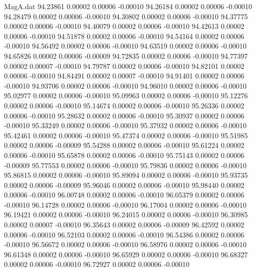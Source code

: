 \begin{filecontents}{MagA.dat}
  94.23861    0.00002    0.00006   -0.00010
  94.26184    0.00002    0.00006   -0.00010
  94.28479    0.00002    0.00006   -0.00010
  94.30802    0.00002    0.00006   -0.00010
  94.37775    0.00002    0.00006   -0.00010
  94.40079    0.00002    0.00006   -0.00010
  94.42613    0.00002    0.00006   -0.00010
  94.51878    0.00002    0.00006   -0.00010
  94.54164    0.00002    0.00006   -0.00010
  94.56492    0.00002    0.00006   -0.00010
  94.63519    0.00002    0.00006   -0.00010
  94.65826    0.00002    0.00006   -0.00009
  94.72835    0.00002    0.00006   -0.00010
  94.77397    0.00002    0.00007   -0.00010
  94.79787    0.00002    0.00006   -0.00010
  94.82101    0.00002    0.00006   -0.00010
  94.84491    0.00002    0.00007   -0.00010
  94.91401    0.00002    0.00006   -0.00010
  94.93706    0.00002    0.00006   -0.00010
  94.96010    0.00002    0.00006   -0.00010
  95.02977    0.00002    0.00006   -0.00010
  95.09963    0.00002    0.00006   -0.00010
  95.12276    0.00002    0.00006   -0.00010
  95.14674    0.00002    0.00006   -0.00010
  95.26336    0.00002    0.00006   -0.00010
  95.28632    0.00002    0.00006   -0.00010
  95.30937    0.00002    0.00006   -0.00010
  95.33249    0.00002    0.00006   -0.00010
  95.37932    0.00002    0.00006   -0.00010
  95.42461    0.00002    0.00006   -0.00010
  95.47374    0.00002    0.00006   -0.00010
  95.51985    0.00002    0.00006   -0.00009
  95.54288    0.00002    0.00006   -0.00010
  95.61224    0.00002    0.00006   -0.00010
  95.65878    0.00002    0.00006   -0.00010
  95.75143    0.00002    0.00006   -0.00009
  95.77553    0.00002    0.00006   -0.00010
  95.79836    0.00002    0.00006   -0.00010
  95.86815    0.00002    0.00006   -0.00010
  95.89094    0.00002    0.00006   -0.00010
  95.93735    0.00002    0.00006   -0.00009
  95.96046    0.00002    0.00006   -0.00010
  95.98440    0.00002    0.00006   -0.00010
  96.00748    0.00002    0.00006   -0.00010
  96.05379    0.00002    0.00006   -0.00010
  96.14728    0.00002    0.00006   -0.00010
  96.17004    0.00002    0.00006   -0.00010
  96.19421    0.00002    0.00006   -0.00010
  96.24015    0.00002    0.00006   -0.00010
  96.30985    0.00002    0.00007   -0.00010
  96.35643    0.00002    0.00006   -0.00009
  96.42592    0.00002    0.00006   -0.00010
  96.52103    0.00002    0.00006   -0.00010
  96.54386    0.00002    0.00006   -0.00010
  96.56672    0.00002    0.00006   -0.00010
  96.58976    0.00002    0.00006   -0.00010
  96.61348    0.00002    0.00006   -0.00010
  96.65929    0.00002    0.00006   -0.00010
  96.68327    0.00002    0.00006   -0.00010
  96.72927    0.00002    0.00006   -0.00010

\end{filecontents}
